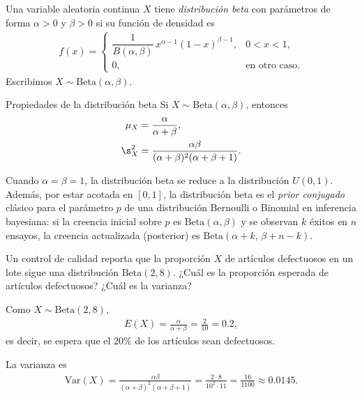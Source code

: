 \begin{definicion}
Una variable aleatoria continua $X$ tiene \emph{distribución beta} con parámetros de
forma $\alpha > 0$ y $\beta > 0$ si su función de densidad es
\begin{align}
 \label{eq:2.8.17}
 f(x) =
 \begin{cases}
  \dfrac{1}{B(\alpha,\beta)}\,x^{\alpha-1}(1-x)^{\beta-1}, & 0 < x < 1, \\
  0, & \text{en otro caso.}
 \end{cases}
\end{align}
Escribimos $X \sim \text{Beta}(\alpha,\beta)$.
\end{definicion}

{Propiedades de la distribución beta} Si $X \sim \text{Beta}(\alpha,\beta)$, entonces
\begin{align}
 \mu_X &= \frac{\alpha}{\alpha+\beta}, \\
 \s_X^2 &= \frac{\alpha\beta}{(\alpha+\beta)^2(\alpha+\beta+1)}.
\end{align}

\begin{observacion}
Cuando $\alpha=\beta=1$, la distribución beta se reduce a la distribución $U(0,1)$.
Además, por estar acotada en $[0,1]$, la distribución beta es el \emph{prior
conjugado} clásico para el parámetro $p$ de una distribución Bernoulli o Binomial
en inferencia bayesiana: si la creencia inicial sobre $p$ es $\text{Beta}(\alpha,\beta)$
y se observan $k$ éxitos en $n$ ensayos, la creencia actualizada (posterior) es
$\text{Beta}(\alpha+k,\, \beta+n-k)$.
\end{observacion}

\begin{ejemplo}
 \label{exmp:2.8.7}
Un control de calidad reporta que la proporción $X$ de artículos defectuosos en un
lote sigue una distribución $\text{Beta}(2,8)$. ¿Cuál es la proporción esperada de
artículos defectuosos? ¿Cuál es la varianza?
\end{ejemplo}

\begin{solucion}
Como $X \sim \text{Beta}(2,8)$,
\begin{align}
 E(X) = \frac{\alpha}{\alpha+\beta} = \frac{2}{10} = 0.2,
\end{align}
es decir, se espera que el $20\%$ de los artículos sean defectuosos.

La varianza es
\begin{align}
 \text{Var}(X) = \frac{\alpha\beta}{(\alpha+\beta)^2(\alpha+\beta+1)}
 = \frac{2\cdot 8}{10^2 \cdot 11} = \frac{16}{1100} \approx 0.0145.
\end{align}
\end{solucion}



